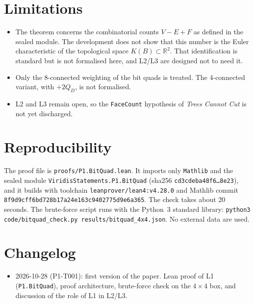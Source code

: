 \documentclass[11pt]{article}
\theoremstyle{definition}
\theoremstyle{remark}
\begin{document}
\section{Limitations}

\begin{itemize}
\item The theorem concerns the combinatorial counts $V-E+F$ as defined in the
  sealed module. The development does not show that this number is the Euler
  characteristic of the topological space $K(B)\subset\mathbb{R}^2$. That
  identification is standard but is not formalised here, and L2/L3 are
  designed not to need it.
\item Only the 8-connected weighting of the bit quads is treated. The
  4-connected variant, with $+2Q_D$, is not formalised.
\item L2 and L3 remain open, so the \texttt{FaceCount} hypothesis of
  \emph{Trees Cannot Cut} is not yet discharged.
\end{itemize}

\section{Reproducibility}

The proof file is \texttt{proofs/P1.BitQuad.lean}. It imports only
\texttt{Mathlib} and the sealed module \texttt{ViridisStatements.P1.BitQuad}
(sha256 \texttt{cd3cdeba48f6\ldots{}8e23}), and it builds with toolchain
\texttt{leanprover/lean4:v4.28.0} and Mathlib commit
\texttt{8f9d9cff6bd728b17a24e163c9402775d9e6a365}. The check takes about 20
seconds. The brute-force script runs with the Python~3 standard library:
\texttt{python3 code/bitquad\_check.py results/bitquad\_4x4.json}. No external
data are used.

\section*{Changelog}
\begin{itemize}
\item 2026-10-28 (P1-T001): first version of the paper. Lean proof of L1
  (\texttt{P1.BitQuad}), proof architecture, brute-force check on the
  $4\times4$ box, and discussion of the role of L1 in L2/L3.
\end{itemize}



\end{document}
